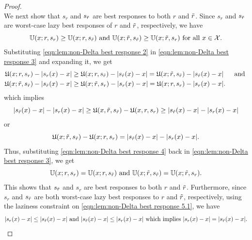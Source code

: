 \begin{proof}
\begin{equation}
    \end{equation}
    We next show that $s_r$ and $s_{\tilde{r}}$ are best responses to both $r$ and $\tilde{r}$. Since $s_r$ and $s_{\tilde{r}}$ are worst-case lazy best responses of $r$ and $\tilde{r}$, respectively, we have
    \begin{equation}\label{eqn:lem:non-Delta best response 3}
        \mathbb{U}(x;r,s_r) \geq \mathbb{U}(x;r,s_{\tilde{r}}) \text{ and } \mathbb{U}(x;\tilde{r},s_{\tilde{r}}) \geq \mathbb{U}(x;\tilde{r},s_r) \text{ for all } x \in \mathcal{X}.
    \end{equation}
    Substituting \eqref{eqn:lem:non-Delta best response 2} in \eqref{eqn:lem:non-Delta best response 3} and expanding it, we get
    \begin{equation*}
        \begin{aligned}
            \mathfrak{U}(x;r,s_r) - |s_r(x)-x| &\geq \mathfrak{U}(x;r,s_{\tilde{r}})   - |s_{\tilde{r}}(x) -x| = \mathfrak{U}(x;\tilde{r},s_{\tilde{r}})   - |s_{\tilde{r}}(x) -x| &\text{ and }\\
            \mathfrak{U}(x;\tilde{r},s_{\tilde{r}}) - |s_{\tilde{r}}(x)-x| &\geq \mathfrak{U}(x;\tilde{r},s_r)   - |s_r(x)-x| = \mathfrak{U}(x;r,s_r)   - |s_r(x)-x|.
        \end{aligned}
    \end{equation*}
    which implies
    \[
    |s_{\tilde{r}}(x) - x| - |s_r(x) -x| \geq \mathfrak{U}(x,\tilde{r},s_{\tilde{r}}) - \mathfrak{U}(x,r,s_r) \geq |s_{\tilde{r}}(x) - x| - |s_r(x) -x|
    \]
    or
    \begin{equation}\label{eqn:lem:non-Delta best response 4}
        \mathfrak{U}(x;\tilde{r},s_{\tilde{r}}) - \mathfrak{U}(x;r,s_r) = |s_{\tilde{r}}(x) - x| - |s_r(x) -x|.
    \end{equation}
    Thus, substituting \eqref{eqn:lem:non-Delta best response 4} back in \eqref{eqn:lem:non-Delta best response 3}, we get
    \begin{equation}\label{eqn:lem:non-Delta best response 5.1}
        \mathbb{U}(x;r,s_r) = \mathbb{U}(x;r,s_{\tilde{r}}) \text{ and } \mathbb{U}(x;\tilde{r},s_{\tilde{r}}) = \mathbb{U}(x;\tilde{r},s_r).
    \end{equation}
    This shows that $s_{\tilde{r}}$ and $s_r$ are best responses to both $r$ and $\tilde{r}$.
    Furthermore, since $s_r$ and $s_{\tilde{r}}$ are both worst-case lazy best responses to $r$ and $\tilde{r}$, respectively, using the laziness constraint on \eqref{eqn:lem:non-Delta best response 5.1}, we have
    \begin{equation}\label{eqn:lem:non-delta best response 6}
        |s_r(x)-x| \leq |s_{\tilde{r}}(x) - x| \text{ and } |s_{\tilde{r}}(x) - x| \leq |s_r(x) - x| \text{ which implies } |s_r(x)-x|= |s_{\tilde{r}}(x) -x|.
    \end{equation}

\end{proof}
